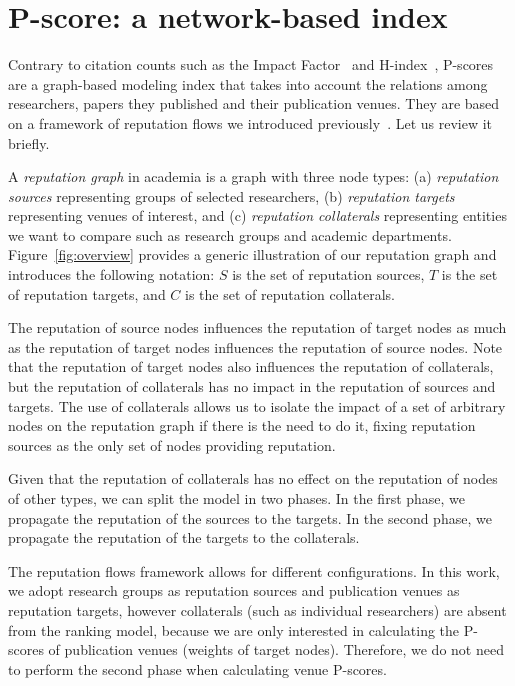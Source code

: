 \documentclass[notitlepage]{svjour3}
\begin{document}
\section{P-score: a network-based index} 
\label{pscore} 

Contrary to citation counts such as the Impact 
Factor~\cite{Garfield1955a,Saha2003,Thomson2017,Balaban2012} and 
H-index~\cite{Benevenuto2016,Bar-Ilan2008,Egghe2008,Bornmann2005,Bornmann2011}, 
P-scores are a graph-based modeling index that takes into account 
the relations among researchers, papers they published and their publication venues. They are 
based on a framework of reputation flows we introduced previously~\cite{Ribas2015}. Let us review 
it briefly. 

A \emph{reputation graph} in academia is a graph with three node types: (a) {\em reputation sources} representing groups of selected researchers, 
(b) {\em reputation targets} representing venues of interest, and
(c) {\em reputation collaterals} representing entities we want to compare such as research groups and academic 
departments. 
Figure~\ref{fig:overview} provides a generic illustration of our reputation graph and introduces the following 
notation: $S$ is the set of reputation sources, $T$ is the set of reputation targets, and $C$ is the set of reputation collaterals.

The reputation of source nodes influences the reputation
of target nodes as much as the reputation of target nodes
influences the reputation of source nodes. Note that the
reputation of target nodes also influences the reputation of
collaterals, but the reputation of collaterals has no impact
in the reputation of sources and targets. The use of collaterals
allows us to isolate the impact of a set of arbitrary
nodes on the reputation graph if there is the need to do it, 
fixing reputation sources as the only set of nodes providing reputation. 

Given that the reputation of collaterals has no effect on
the reputation of nodes of other types, we can split the model
in two phases. In the first phase, we propagate the reputation
of the sources to the targets. In the second phase, we
propagate the reputation of the targets to the collaterals.

The reputation flows framework allows for different configurations.
In this work, we adopt research groups as reputation sources and publication 
venues as reputation targets, however collaterals (such as individual researchers) 
are absent from the ranking model, because we are only interested in calculating the 
P-scores of publication venues (weights of target nodes). Therefore, we do not need to
perform the second phase when calculating venue P-scores.
\end{document}
